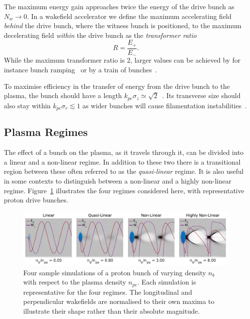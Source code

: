 The maximum energy gain approaches twice the energy of the drive bunch as $N_{w} \to 0$.
In a wakefield accelerator we define the maximum accelerating field \textit{behind} the drive bunch, where the witness bunch is positioned, to the maximum decelerating field \textit{within} the drive bunch as the \textit{transformer ratio}~\cite{muggli:2017}
\begin{equation}
    R = \frac{E_{+}}{E_{-}}. \label{EQ:TRat}
\end{equation}
While the maximum transformer ratio is $2$, larger values can be achieved by for instance bunch ramping~\cite{bane:1985} or by a train of bunches~\cite{jing:2006}.

To maximise efficiency in the transfer of energy from the drive bunch to the plasma, the bunch should have a length $k_{pe}\sigma_{z} \simeq \sqrt{2}$~\cite{lu:2005,lee:2000}.
Its transverse size should also stay within $k_{pe}\sigma_{r} \lesssim 1$ as wider bunches will cause filamentation instabilities~\cite{allen:2012,sentoku:2003}.

\subsection{Plasma Regimes}
\label{Int:BPI:Reg}

The effect of a bunch on the plasma, as it travels through it, can be divided into a linear and a non-linear regime.
In addition to these two there is a transitional region between these often referred to as the \textit{quasi-linear} regime.
It is also useful in some contexts to distinguish between a non-linear and a highly non-linear regime.
Figure~\ref{Fig:BPI:Regime} illustrates the four regimes considered here, with representative proton drive bunches.

\begin{figure}[hbt]
    \centering
    \includegraphics[width=1.0\linewidth]{figures/Regimes}
    \caption{\label{Fig:BPI:Regime}
        Four sample simulations of a proton bunch of varying density $n_{b}$ with respect to the plasma density $n_{pe}$.
        Each simulation is representative for the four regimes.
        The longitudinal and perpendicular wakefields are normalised to their own maxima to illustrate their shape rather than their absolute magnitude.
    }
\end{figure}

